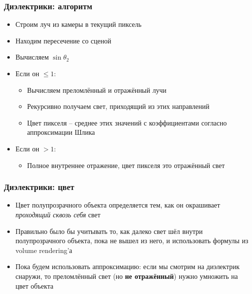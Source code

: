 \documentclass[10pt]{beamer}
\begin{document}
\begin{frame}
\frametitle{Диэлектрики: алгоритм}
\begin{itemize}
\item Строим луч из камеры в текущий пиксель
\pause
\item Находим пересечение со сценой
\pause
\item Вычисляем \begin{math}\sin\theta_2\end{math}
\pause
\item Если он \begin{math}\leq 1\end{math}:
\pause
\begin{itemize}
\item Вычисляем преломлённый и отражённый лучи
\pause
\item Рекурсивно получаем свет, приходящий из этих направлений
\pause
\item Цвет пикселя -- среднее этих значений с коэффициентами согласно аппроксимации Шлика
\end{itemize}
\pause
\item Если он \begin{math}> 1\end{math}:
\pause
\begin{itemize}
\item Полное внутреннее отражение, цвет пикселя это отражённый свет
\end{itemize}
\end{itemize}
\end{frame}

\begin{frame}
\frametitle{Диэлектрики: цвет}
\begin{itemize}
\item Цвет полупрозрачного объекта определяется тем, как он окрашивает \textit{проходящий сквозь себя} свет
\pause
\item Правильно было бы учитывать то, как далеко свет шёл внутри полупрозрачного объекта, пока не вышел из него, и использовать формулы из volume rendering'а
\pause
\item Пока будем использовать аппроксимацию: если мы смотрим на диэлектрик снаружи, то преломлённый свет (но \textbf{не отражённый}) нужно умножить на цвет объекта
\end{itemize}
\end{frame}
\end{document}
